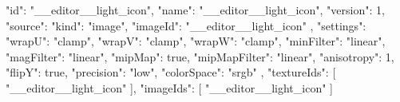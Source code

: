{
  "id": "__editor__light_icon",
  "name": "__editor__light_icon",
  "version": 1,
  "source": {
    "kind": "image",
    "imageId": "__editor__light_icon"
  },
  "settings": {
    "wrapU": "clamp",
    "wrapV": "clamp",
    "wrapW": "clamp",
    "minFilter": "linear",
    "magFilter": "linear",
    "mipMap": true,
    "mipMapFilter": "linear",
    "anisotropy": 1,
    "flipY": true,
    "precision": "low",
    "colorSpace": "srgb"
  },
  "textureIds": [
    "__editor__light_icon"
  ],
  "imageIds": [
    "__editor__light_icon"
  ]
}
